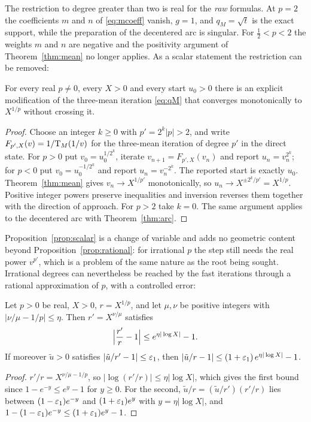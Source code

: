 The restriction to degree greater than two is real for the \emph{raw} formulas. At $p=2$ the
coefficients $m$ and $n$ of \eqref{eq:mcoeff} vanish, $g=1$, and $q_M=\sqrt t$ is the exact support,
while the preparation of the decentered arc is singular. For $\tfrac12<p<2$ the weights $m$ and $n$ are
negative and the positivity argument of Theorem~\ref{thm:mean} no longer applies. As a scalar statement
the restriction can be removed:

\begin{proposition}\label{prop:scalar}
For every real $p\neq0$, every $X>0$ and every start $u_0>0$ there is an explicit modification of the
three-mean iteration \eqref{eq:qM} that converges monotonically to $X^{1/p}$ without crossing it.
\end{proposition}
\begin{proof}
Choose an integer $k\ge0$ with $p'=2^{k}|p|>2$, and write $F_{p',X}(v)=1/\mathrm{T}_M(1/v)$ for the three-mean
iteration of degree $p'$ in the direct state. For $p>0$ put $v_0=u_0^{1/2^{k}}$, iterate
$v_{n+1}=F_{p',X}(v_n)$ and report $u_n=v_n^{2^{k}}$; for $p<0$ put $v_0=u_0^{-1/2^{k}}$ and report
$u_n=v_n^{-2^{k}}$. The reported start is exactly $u_0$. Theorem~\ref{thm:mean} gives
$v_n\to X^{1/p'}$ monotonically, so $u_n\to X^{\pm2^{k}/p'}=X^{1/p}$. Positive integer powers preserve
inequalities and inversion reverses them together with the direction of approach. For $p>2$ take
$k=0$. The same argument applies to the decentered arc with Theorem~\ref{thm:arc}.
\end{proof}

Proposition~\ref{prop:scalar} is a change of variable and adds no geometric content beyond
Proposition~\ref{prop:rational}: for irrational $p$ the step still needs the real power
$v^{p'}$, which is a problem of the same nature as the root being sought. Irrational degrees can
nevertheless be reached by the fast iterations through a rational approximation of $p$, with a
controlled error:

\begin{proposition}\label{prop:irrational}
Let $p>0$ be real, $X>0$, $r=X^{1/p}$, and let $\mu,\nu$ be positive integers with
$\bigl|\nu/\mu-1/p\bigr|\le\eta$. Then $r'=X^{\nu/\mu}$ satisfies
\[ \Bigl|\frac{r'}{r}-1\Bigr|\le e^{\eta|\log X|}-1 . \]
If moreover $\tilde u>0$ satisfies $|\tilde u/r'-1|\le\varepsilon_1$, then
$|\tilde u/r-1|\le(1+\varepsilon_1)\,e^{\eta|\log X|}-1$.
\end{proposition}
\begin{proof}
$r'/r=X^{\nu/\mu-1/p}$, so $|\log(r'/r)|\le\eta|\log X|$, which gives the first bound since
$1-e^{-y}\le e^{y}-1$ for $y\ge0$. For the second, $\tilde u/r=(\tilde u/r')(r'/r)$ lies between
$(1-\varepsilon_1)e^{-y}$ and $(1+\varepsilon_1)e^{y}$ with $y=\eta|\log X|$, and
$1-(1-\varepsilon_1)e^{-y}\le(1+\varepsilon_1)e^{y}-1$.
\end{proof}

